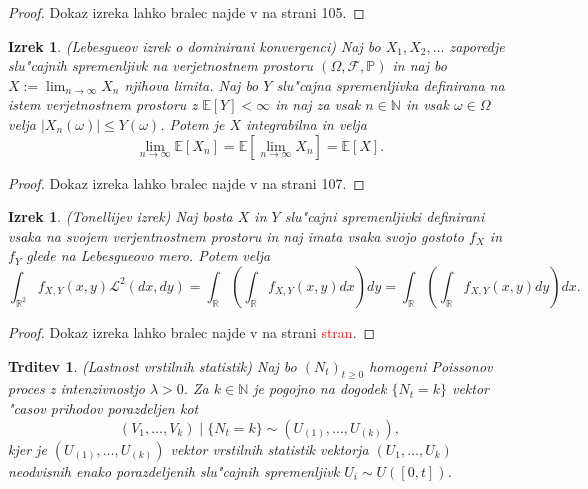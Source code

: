 \documentclass[12pt, a4paper, reqno]{amsart}
\theoremstyle{definition}
\theoremstyle{plain}
\newtheorem{izrek}[definicija]{Izrek}
\newtheorem{trditev}[definicija]{Trditev}
\newcommand{\R}{\mathbb{R}}
\newcommand{\N}{\mathbb{N}}
\newcommand{\E}{\mathbb{E}}
\newcommand{\Prob}{\mathbb{P}}
\newcommand{\1}{\mathds{1}}
\begin{document}
    \begin{proof}
        Dokaz izreka lahko bralec najde v \cite{7} na strani 105.
    \end{proof}  

    \begin{izrek}(Lebesgueov izrek o dominirani konvergenci)
        Naj bo $X_1, X_2, \dots $ zaporedje slu"cajnih spremenljivk na verjetnostnem prostoru
        $(\Omega, \mathcal{F}, \Prob)$ in naj bo $X:= \lim_{n\to\infty}X_n$ njihova limita.
        Naj bo $Y$ slu"cajna spremenljivka definirana na istem verjetnostnem prostoru z $\E\left[Y\right]<\infty$ in
        naj za vsak $n\in\N$ in vsak $\omega\in\Omega$ velja $|X_n(\omega)| \leq Y(\omega)$. Potem je $X$ integrabilna
        in velja 
        \begin{equation*}
            \lim_{n\to\infty}\E\left[X_n\right] = \E\left[\lim_{n\to\infty}X_n\right] = \E\left[X\right].
        \end{equation*}
        \label{izr:dominiranaKonvergenca}
    \end{izrek}

    \begin{proof}
        Dokaz izreka lahko bralec najde v \cite{7} na strani 107.
    \end{proof}

    \begin{izrek}(Tonellijev izrek)
        Naj bosta $X$ in $Y$ slu"cajni spremenljivki definirani vsaka na svojem verjentnostnem prostoru
        in naj imata vsaka svojo gostoto $f_X$ in $f_Y$ glede na Lebesgueovo mero.
        Potem velja
        \begin{equation*}
            \int_{\R^2}f_{X, Y}(x, y)\mathcal{L}^2(dx, dy) 
            = \int_{\R}\left(\int_{\R}f_{X, Y}(x, y)dx\right)dy = \int_{\R}\left(\int_{\R}f_{X, Y}(x, y)dy\right)dx.
        \end{equation*}
        \label{izr:TonellijevIzrek}
    \end{izrek}

    \begin{proof}
        Dokaz izreka lahko bralec najde v \cite{7} na strani \textcolor{red}{stran}.
    \end{proof} 

    \begin{trditev}(Lastnost vrstilnih statistik)
        Naj bo $(N_t)_{t\geq0}$ homogeni Poissonov proces z intenzivnostjo $\lambda > 0$. 
        Za $k\in\N$ je pogojno na dogodek $\{N_t = k\}$ vektor "casov prihodov porazdeljen kot 
        \begin{equation*}
            (V_1, \dots, V_k) \mid \{N_t = k\} \sim (U_{(1)}, \dots, U_{(k)}),
        \end{equation*}
        kjer je $(U_{(1)}, \dots, U_{(k)})$ vektor vrstilnih statistik vektorja $(U_1, \dots, U_k)$ 
        neodvisnih \newline enako porazdeljenih slu"cajnih spremenljivk $U_i\sim U\left([0, t]\right)$.
        \label{trd:VrstilneStatistikeHPP}
    \end{trditev}
\end{document}

